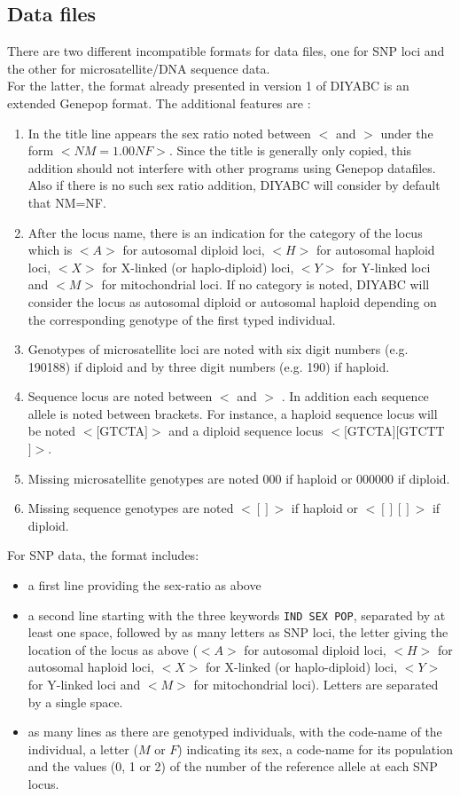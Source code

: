 \subsection{Data files}
There are two different incompatible formats for data files, one for SNP loci and the other for microsatellite/DNA sequence data.\\ For the latter, the format already presented in version 1 of DIYABC is an extended Genepop format. The additional features are :
\begin{enumerate}
\item In the title line appears the sex ratio noted between \textsf{$<$} and \textsf{$>$} under the form \textsf{$<NM=1.00NF>$}. Since the title is generally only copied, this addition should not interfere with other programs using  Genepop datafiles. Also if there is no such sex ratio addition, DIYABC will consider by default that NM=NF.
\item After the locus name, there is an indication for the category of the locus which is $<A>$ for autosomal diploid loci, $<H>$ for autosomal haploid loci, $<X>$ for X-linked (or haplo-diploid) loci, $<Y>$ for Y-linked loci and $<M>$ for mitochondrial loci. If no category is noted, DIYABC will consider the locus as autosomal diploid or autosomal haploid depending on the corresponding genotype of the first typed individual.
\item Genotypes of microsatellite loci are noted with six digit numbers (e.g. 190188) if diploid and by three digit numbers (e.g. 190) if haploid.
\item Sequence locus are noted between  \textsf{$<$} and \textsf{$>$} . In addition each sequence allele is noted between brackets. For instance, a haploid sequence locus  will be noted $<[$GTCTA$]>$ and a diploid sequence locus $<[$GTCTA$][$GTCTT$]>$.
\item Missing microsatellite genotypes are noted \textsf{000} if haploid or \textsf{000000} if diploid.
\item Missing sequence genotypes are noted $<[]>$ if haploid or $<[][]>$ if diploid.
\end{enumerate}

For SNP data, the format includes:
\begin{itemize}
 \item a first line providing the sex-ratio as above
 \item a second line starting with the three keywords \texttt{IND  SEX  POP}, separated by at least one space, followed by as many letters as SNP loci, the letter giving the location of the locus as above ($<A>$ for autosomal diploid loci, $<H>$ for autosomal haploid loci, $<X>$ for X-linked (or haplo-diploid) loci, $<Y>$ for Y-linked loci and $<M>$ for mitochondrial loci). Letters are separated by a single space.
 \item as many lines as there are genotyped individuals, with the code-name of the individual, a letter ($M$ or $F$) indicating its sex, a code-name for its population and the values (0, 1 or 2) of the number of the reference allele at each SNP locus. 
\end{itemize}


